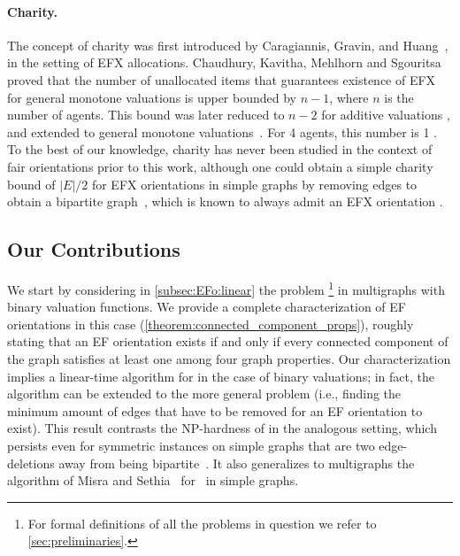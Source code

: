 \documentclass[11pt,letterpaper]{article}
\begin{document}
\paragraph{Charity.}
The concept of charity was first introduced by Caragiannis, Gravin, and Huang~\cite{CGH19}, in the setting of EFX allocations.
Chaudhury, Kavitha, Mehlhorn and Sgouritsa~\cite{CKMS21} proved that the number of unallocated items that guarantees existence of EFX for general monotone valuations is upper bounded by $n-1$, where $n$ is the number of agents. This bound was later reduced to $n-2$ for additive valuations \cite{AlmostFullEFXforFourAgents}, and extended to general monotone valuations~\cite{mahara2021extensionadditivevaluationsgeneral}. For 4 agents, this number is 1 \cite{AlmostFullEFXforFourAgents}.
To the best of our knowledge, charity has never been studied in the context of fair orientations prior to this work, although one could obtain a simple charity bound of $|E|/2$ for EFX orientations in simple graphs by removing edges to obtain a bipartite graph~\cite{erd/Erdos65},
which is known to always admit an EFX orientation \cite{ifaamas/ZengM25}.




\subsection{Our Contributions}\label{sec:contributions}



We start by considering in \cref{subsec:EFo:linear} the {\EFo} problem%
\footnote{For formal definitions of all the problems in question we refer to \cref{sec:preliminaries}.} in multigraphs with binary valuation functions.
We provide a complete characterization of EF orientations in this case (\cref{theorem:connected_component_props}), roughly stating that an EF orientation exists if and only if every connected component of the graph satisfies at least one among four graph properties. Our characterization implies a linear-time algorithm for {\EFo} in the case of binary valuations; in fact, the algorithm can be extended to the more general {\EFmc} problem (i.e., finding the minimum amount of edges that have to be removed for an EF orientation to exist).
This result contrasts the NP-hardness of {\EFXo} in the analogous setting,
which persists even for symmetric instances on simple graphs that are two edge-deletions away from being bipartite~\cite{sagt/BlazejGRS25}. It also generalizes to multigraphs the algorithm of Misra and Sethia~\cite{aldt/MisraS24} for \EFo\ in simple graphs.
\end{document}
